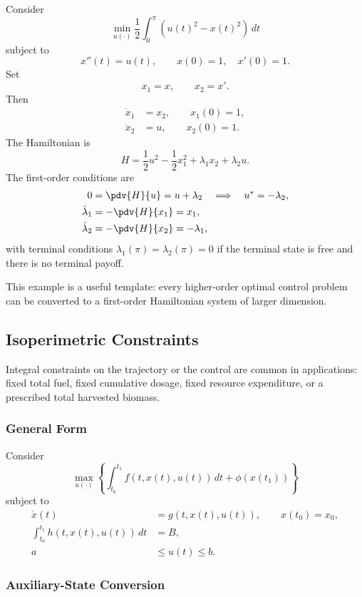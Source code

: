 \documentclass[11pt]{article}
\theoremstyle{definition}
\begin{document}
Consider
\[
\min_{u(\cdot)} \frac{1}{2}\int_0^\pi \left(u(t)^2-x(t)^2\right)\,dt
\]
subject to
\[
x''(t)=u(t), \qquad x(0)=1,\quad x'(0)=1.
\]
Set
\[
x_1=x,\qquad x_2=x'.
\]
Then
\begin{align}
\dot{x}_1 &= x_2,\qquad x_1(0)=1,\\
\dot{x}_2 &= u,\qquad x_2(0)=1.
\end{align}
The Hamiltonian is
\[
H=\frac{1}{2}u^2-\frac{1}{2}x_1^2+\lambda_1 x_2+\lambda_2 u.
\]
The first-order conditions are
\begin{align}
0 &= \pdv{H}{u}=u+\lambda_2 \quad \Longrightarrow \quad u^*=-\lambda_2,\\
\dot{\lambda}_1 &= -\pdv{H}{x_1}=x_1,\\
\dot{\lambda}_2 &= -\pdv{H}{x_2}=-\lambda_1,
\end{align}
with terminal conditions $\lambda_1(\pi)=\lambda_2(\pi)=0$ if the terminal state is free and there is no terminal payoff.

This example is a useful template: every higher-order optimal control problem can be converted to a first-order Hamiltonian system of larger dimension.

\subsection{Isoperimetric Constraints}

Integral constraints on the trajectory or the control are common in applications: fixed total fuel, fixed cumulative dosage, fixed resource expenditure, or a prescribed total harvested biomass.

\subsubsection{General Form}

Consider
\begin{equation}
\max_{u(\cdot)} \left\{
\int_{t_0}^{t_1} f(t,x(t),u(t))\,dt + \phi(x(t_1))
\right\}
\end{equation}
subject to
\begin{align}
\dot{x}(t) &= g(t,x(t),u(t)), \qquad x(t_0)=x_0,\\
\int_{t_0}^{t_1} h(t,x(t),u(t))\,dt &= B,\\
a &\le u(t)\le b.
\end{align}

\subsubsection{Auxiliary-State Conversion}
\end{document}

